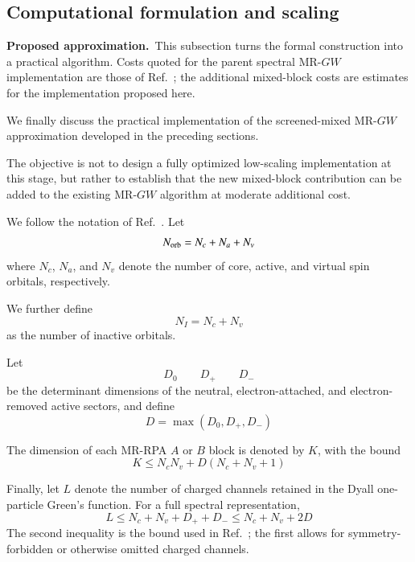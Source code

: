 \documentclass[aip,jcp,reprint,noshowkeys,superscriptaddress]{revtex4-1}
\newcommand{\Proposed}{\textbf{Proposed approximation.}\ }
\begin{document}
\subsection{Computational formulation and scaling}
\label{sec:implementation}

\Proposed This subsection turns the formal construction into a practical
algorithm.  Costs quoted for the parent spectral MR-$GW$ implementation are
those of Ref.~\cite{WangFangLi2026}; the additional mixed-block costs are
estimates for the implementation proposed here.


We finally discuss the practical implementation of the screened-mixed
MR-$GW$ approximation developed in the preceding sections.

The objective is not to design a fully optimized low-scaling
implementation at this stage, but rather to establish that the new
mixed-block contribution can be added to the existing MR-$GW$
algorithm at moderate additional cost.

We follow the notation of Ref.~\cite{WangFangLi2026}.  Let
\begin{equation}
  N_{\rm orb}
  =
  N_c+N_a+N_v
\end{equation}
where $N_c$, $N_a$, and $N_v$ denote the number of core, active, and
virtual spin orbitals, respectively.

We further define
\begin{equation}
  N_I
  =
  N_c+N_v
\end{equation}
as the number of inactive orbitals.

Let
\begin{equation}
  D_0
  \qquad
  D_+
  \qquad
  D_-
\end{equation}
be the determinant dimensions of the neutral, electron-attached, and
electron-removed active sectors, and define
\begin{equation}
  D
  =
  \max(D_0,D_+,D_-)
\end{equation}

The dimension of each MR-RPA $A$ or $B$ block is denoted by $K$, with
the bound
\begin{equation}
  K
  \le
  N_cN_v
  +
  D(N_c+N_v+1)
  \label{eq:K-dimension}
\end{equation}

Finally, let $L$ denote the number of charged channels retained in the
Dyall one-particle Green's function.  For a full spectral representation,
\begin{equation}
  L
  \le
  N_c+N_v+D_++D_-
  \le
  N_c+N_v+2D
  \label{eq:L-dimension}
\end{equation}
The second inequality is the bound used in Ref.~\cite{WangFangLi2026}; the
first allows for symmetry-forbidden or otherwise omitted charged channels.
\end{document}
